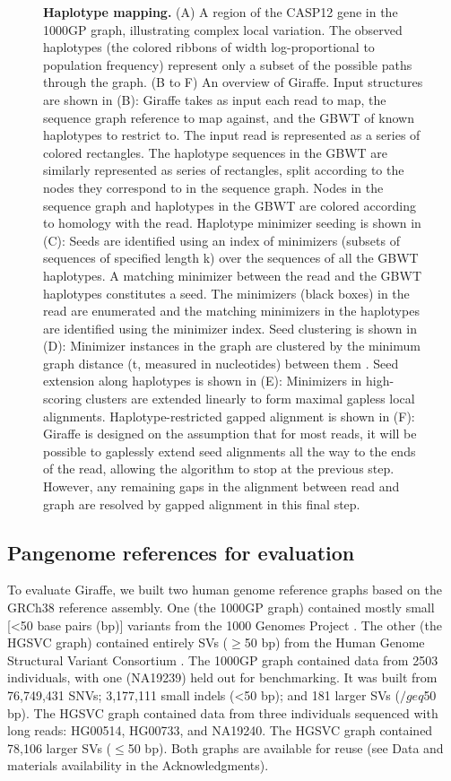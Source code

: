 \documentclass[11pt]{ucscthesis}
\begin{document}
\begin{figure}
    \caption[Haplotype mapping]{\textbf{Haplotype mapping.} (A) A region of the CASP12 gene in the 1000GP graph, illustrating complex local variation. The observed haplotypes (the colored ribbons of width log-proportional to population frequency) represent only a subset of the possible paths through the graph. (B to F) An overview of Giraffe. Input structures are shown in (B): Giraffe takes as input each read to map, the sequence graph reference to map against, and the GBWT of known haplotypes to restrict to. The input read is represented as a series of colored rectangles. The haplotype sequences in the GBWT are similarly represented as series of rectangles, split according to the nodes they correspond to in the sequence graph. Nodes in the sequence graph and haplotypes in the GBWT are colored according to homology with the read. Haplotype minimizer seeding is shown in (C): Seeds are identified using an index of minimizers (subsets of sequences of specified length k)\cite{Roberts2004} over the sequences of all the GBWT haplotypes. A matching minimizer between the read and the GBWT haplotypes constitutes a seed. The minimizers (black boxes) in the read are enumerated and the matching minimizers in the haplotypes are identified using the minimizer index. Seed clustering is shown in (D): Minimizer instances in the graph are clustered by the minimum graph distance (t, measured in nucleotides) between them \cite{chang_distance_2020}. Seed extension along haplotypes is shown in (E): Minimizers in high-scoring clusters are extended linearly to form maximal gapless local alignments. Haplotype-restricted gapped alignment is shown in (F): Giraffe is designed on the assumption that for most reads, it will be possible to gaplessly extend seed alignments all the way to the ends of the read, allowing the algorithm to stop at the previous step. However, any remaining gaps in the alignment between read and graph are resolved by gapped alignment in this final step.}
    \label{fig:aim2_fig1}
\end{figure}

\subsection{Pangenome references for evaluation}
To evaluate Giraffe, we built two human genome reference graphs based on the GRCh38 reference assembly.
One (the 1000GP graph) contained mostly small [<50 base pairs (bp)] variants from the 1000 Genomes Project \cite{1000gp_2015}.
The other (the HGSVC graph) contained entirely SVs ($\geq$50 bp) from the Human Genome Structural Variant Consortium \cite{chaisson_sv_2019}.
The 1000GP graph contained data from 2503 individuals, with one (NA19239) held out for benchmarking.
It was built from 76,749,431 SNVs; 3,177,111 small indels (<50 bp); and 181 larger SVs ($/geq$50 bp).
The HGSVC graph contained data from three individuals sequenced with long reads: HG00514, HG00733, and NA19240.
The HGSVC graph contained 78,106 larger SVs ($\leq$50 bp). Both graphs are available for reuse (see Data and materials availability in the Acknowledgments).
\end{document}
